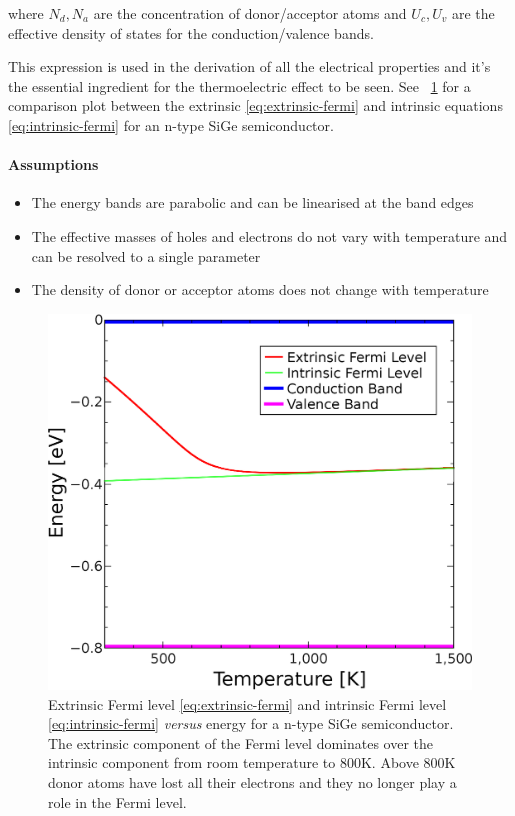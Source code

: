 \documentclass[12pt]{article}
\newcommand{\figref}[2][\figurename~]{#1\ref{#2}}
\begin{document}
where $N_d, N_a$ are the concentration of donor/acceptor atoms and $U_c, U_v$ are the effective density of states for the conduction/valence bands.

This expression is used in the derivation of all the electrical properties and it's the essential ingredient for the thermoelectric effect to be seen. See \figref{fig:fermi-level-compare} for a comparison plot between the extrinsic \eqref{eq:extrinsic-fermi} and intrinsic equations \eqref{eq:intrinsic-fermi} for an n-type SiGe semiconductor.

\paragraph{Assumptions}
\begin{itemize}
  \item The energy bands are parabolic and can be linearised at the band edges
  \item The effective masses of holes and electrons do not vary with temperature and can be resolved to a single parameter
  \item The density of donor or acceptor atoms does not change with temperature
\end{itemize}

\begin{figure}
	\centering
	\includegraphics[width= \textwidth]{fermi-level-compare.eps}
	\caption{Extrinsic Fermi level \eqref{eq:extrinsic-fermi} and intrinsic Fermi level \eqref{eq:intrinsic-fermi} \emph{versus} energy for a n-type SiGe semiconductor. The extrinsic component of the Fermi level dominates over the intrinsic component from room temperature to 800K. Above 800K donor atoms have lost all their electrons and they no longer play a role in the Fermi level.}
	\label{fig:fermi-level-compare}
\end{figure}
\end{document}
